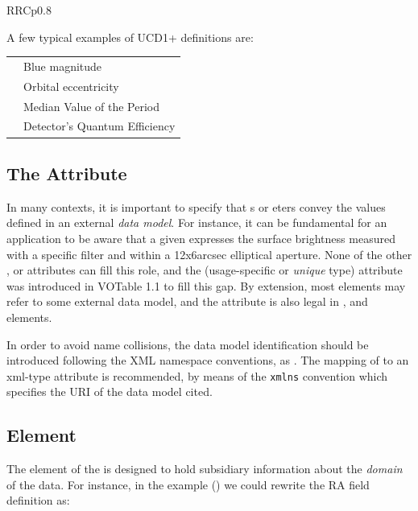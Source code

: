 \begin{tabular}{RRCp{0.8\textwidth}}
\begin{center}
\noindent A few typical examples of UCD1+ definitions
 are:

\begin{tabular}{ll}
{\literalvalue{phot.mag;em.opt.B}}        &  Blue magnitude \\
{\literalvalue{src.orbital.eccentricity}} &  Orbital eccentricity \\
{\literalvalue{time.period;stat.median}}  &  Median Value of the Period \\
{\literalvalue{instr.det.qe}}             &  Detector's Quantum Efficiency \\
\end{tabular}


\subsection{\texorpdfstring{The  Attribute}
                           {The utype Attribute}}
\label{sec:utype}
In many contexts, it is important to specify that s or 
eters convey the values defined in an external {\em data
model}. For instance, it can be fundamental for an application to
be aware that a given  expresses { the} surface brightness
measured with a specific filter and within a 12x6arcsec elliptical aperture.
None of the other , 
or  attributes can fill this role, and 
the  (usage-specific or {\em unique} type) attribute was 
introduced in VOTable 1.1 to fill this gap. 
By extension, most elements may refer to some external data model,
and the  attribute is also legal in ,
 and  elements.

In order to avoid name collisions, the data model identification
should be introduced following the XML namespace conventions,
as .
The mapping of  to an xml-type attribute
is recommended, by means of the {\tt xmlns} convention
which specifies the URI of the data model cited.

\subsection{\texorpdfstring{ Element}
                           {VALUES Element}}
\label{sec:values}

The {} element of the {}
is designed to hold subsidiary information about the {\em domain} of the
data. For instance, in the example ()
we could rewrite the RA field definition as:


\end{center}
\end{tabular}
